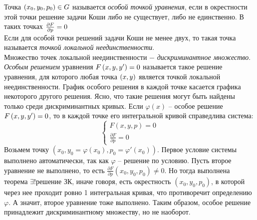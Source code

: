 \noindent \Def Точка $\left({x_0, y_0, p_0}\right) \in G$ называется \textit{особой точкой уравнения}, если в окрестности этой точки решение задачи Коши либо не существует, либо не единственно. В таких точках $\frac{\partial F}{\partial p} = 0$
\\
\Def Если для особой точки решений задачи Коши не менее двух, то такая точка называется \textit{точкой локальной неединственности}.
\\
\Def Множество точек локальной неединственности $-$ \textit{дискриминантное множество}.
\\
\Def \textit{Особым решением} уравнения $F \left({x, y, y'}\right) = 0$ называется такое решение уравнения, для которого любая точка $\left({x, y}\right)$ является точкой локальной неединственности. График особого решения в каждой точке касается графика некоторого другого решения. Ясно, что такие решения могут быть найдены только среди дискриминантных кривых.
\bigbreak
\Th Если $\varphi(x)$ -- особое решение $F \left({x, y, y'}\right) = 0$, то в каждой точке его интегральной кривой справедлива система:
\begin{equation*}
    \begin{cases}
    F(x,y,p) = 0 \\
    \frac{\partial F}{\partial p} = 0
    \end{cases}
\end{equation*}
\Proof Возьмем точку $(x_0, y_0 = \varphi(x_0), p_0=\varphi'(x_0))$. Первое условие системы выполнено автоматически, так как $\varphi$ -- решение по условию. Пусть второе уравнение не выполнено, то есть $\frac{\partial F}{\partial p}(x_0, y_0, p_0) \neq 0$. Но тогда выполнена теорема $\exists ! \text{решение ЗК}$, иначе говоря, есть окрестность $(x_0, y_0, p_0)$, в которой через нее проходит ровно 1 интегральная кривая, что противоречит определению $\varphi$. А значит, второе уравнение тоже выполнено. \; \EndProof
\bigbreak 
Таким образом, особое решение принадлежит дискриминантному множеству, но не наоборот.